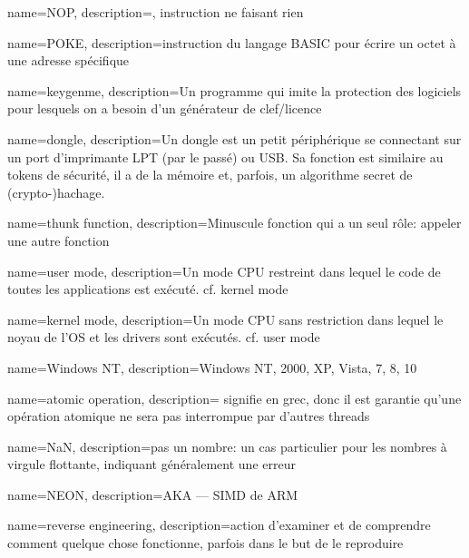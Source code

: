 {
  name=NOP,
  description={, instruction ne faisant rien}
}

{
  name=POKE,
  description={instruction du langage BASIC pour écrire un octet à une adresse spécifique}
}

{
  name=keygenme,
  description={Un programme qui imite la protection des logiciels pour lesquels on a besoin d'un générateur de clef/licence}
} %

{
  name=dongle,
  description={Un dongle est un petit périphérique se connectant sur un port d'imprimante LPT (par le passé) ou USB.
  Sa fonction est similaire au tokens de sécurité, il a de la mémoire et, parfois, un algorithme secret de (crypto-)hachage.}
}

{
  name=thunk function,
  description={Minuscule fonction qui a un seul rôle: appeler une autre fonction}
}

{
  name=user mode,
  description={Un mode CPU restreint dans lequel le code de toutes les applications est exécuté. cf. \gls{kernel mode}}
}

{
  name=kernel mode,
  description={Un mode CPU sans restriction dans lequel le noyau de l'OS et les drivers sont exécutés. cf. \gls{user mode}}
}

{
  name=Windows NT,
  description={Windows NT, 2000, XP, Vista, 7, 8, 10}
}

{
  name=atomic operation,
  description={
  signifie  en grec, donc il est garantie qu'une opération atomique ne sera pas interrompue par d'autres threads}
}

{
  name=NaN,
  description={pas un nombre: un cas particulier pour les nombres à virgule flottante, indiquant généralement une erreur}
}

{
  name=NEON,
  description={\ac{AKA}  --- \ac{SIMD} de ARM}
}

{
  name=reverse engineering,
  description={action d'examiner et de comprendre comment quelque chose fonctionne, parfois dans le but de le reproduire}
}

